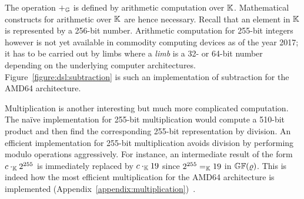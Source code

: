  
The operation $+_{\mathbb{G}}$ is defined by arithmetic computation over
$\mathbb{K}$. %
Mathematical constructs for
arithmetic over $\mathbb{K}$ are hence necessary. Recall that
an element in $\mathbb{K}$ is represented by a 256-bit number. 
Arithmetic computation for 255-bit integers however is not yet
available in commodity computing devices as of the year
2017; it has to be carried out by limbs where a
\emph{limb} is a 32- or 64-bit number depending on the underlying
computer architectures. Figure~\ref{figure:dsl:subtraction}
is such an
implementation of subtraction for the AMD64 architecture. 



Multiplication is another interesting but much more
complicated computation. The na\"ive implementation for 255-bit
multiplication would compute a 510-bit product and then find the
corresponding 255-bit representation by division. 
An efficient implementation for 255-bit multiplication avoids
division by performing modulo operations aggressively. 
For instance, an intermediate
result of the form $c \cdot_{\mathbb{K}} 2^{255}$ is immediately replaced by
$c \cdot_{\mathbb{K}} 19$ since $2^{255} =_{\mathbb{K}} 19$ in $\mathbb{GF}(\varrho)$. 
This is indeed how the most efficient multiplication for the AMD64
architecture is implemented (Appendix~\ref{appendix:multiplication})~\cite{BDL+:11:HSHSS,BDL+:12:HSHSS}.



